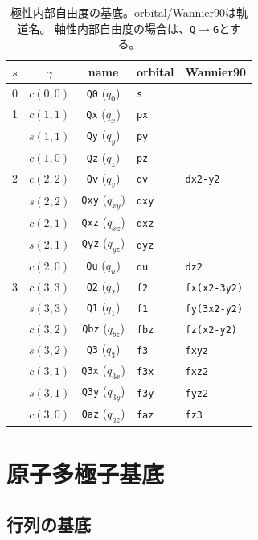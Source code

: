 \documentclass[11pt]{easymemo}
\begin{document}
\begin{table}[t!]
\caption{極性内部自由度の基底。orbital/Wannier90は軌道名。
軸性内部自由度の場合は、{\tt Q}$\to${\tt G}とする。
\label{tbl:tesbasis}}
\begin{center}
\begin{tabular}{cccll} \hline\hline
$s$ & $\gamma$ & name & orbital & Wannier90 \\ \hline
0 & $c(0,0)$ & {\tt Q0} ($q_{0}$) & {\tt s} \\ \hline
1 & $c(1,1)$ & {\tt Qx} ($q_{x}$) & {\tt px} \\
  & $s(1,1)$ & {\tt Qy} ($q_{y}$) & {\tt py} \\
  & $c(1,0)$ & {\tt Qz} ($q_{z}$) & {\tt pz} \\
\hline
2 & $c(2,2)$ & {\tt Qv} ($q_{v}$) & {\tt dv} & {\tt dx2-y2} \\
  & $s(2,2)$ & {\tt Qxy} ($q_{xy}$) & {\tt dxy} \\
  & $c(2,1)$ & {\tt Qxz} ($q_{xz}$) & {\tt dxz} \\
  & $s(2,1)$ & {\tt Qyz} ($q_{yz}$) & {\tt dyz} \\
  & $c(2,0)$ & {\tt Qu} ($q_{u}$) &  {\tt du} & {\tt dz2} \\
\hline
3 & $c(3,3)$ & {\tt Q2} ($q_{2}$) & {\tt f2} & {\tt fx(x2-3y2)} \\
  & $s(3,3)$ & {\tt Q1} ($q_{1}$) & {\tt f1} & {\tt fy(3x2-y2)} \\
  & $c(3,2)$ & {\tt Qbz} ($q_{bz}$) & {\tt fbz} & {\tt fz(x2-y2)} \\
  & $s(3,2)$ & {\tt Q3} ($q_{3}$) & {\tt f3} & {\tt fxyz} \\
  & $c(3,1)$ & {\tt Q3x} ($q_{3x}$) & {\tt f3x} & {\tt fxz2} \\
  & $s(3,1)$ & {\tt Q3y} ($q_{3y}$) & {\tt f3y} & {\tt fyz2} \\
  & $c(3,0)$ & {\tt Qaz} ($q_{az}$) & {\tt faz} & {\tt fz3} \\
\hline\hline
\end{tabular}
\end{center}
\end{table}


\section{原子多極子基底}

\subsection{行列の基底}
\end{document}

